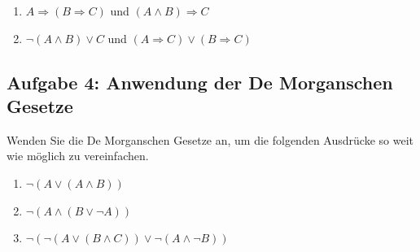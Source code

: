 \documentclass[ngerman,11pt]{article}
\begin{document}
\begin{enumerate}[label=\alph*)]
\item $A \Rightarrow (B \Rightarrow C)$ und $(A \wedge B) \Rightarrow C$
\item $\neg(A \wedge B) \vee C$ und $(A \Rightarrow C) \vee (B \Rightarrow C)$
\end{enumerate}

\subsection*{Aufgabe 4: Anwendung der De Morganschen Gesetze}
Wenden Sie die De Morganschen Gesetze an, um die folgenden Ausdrücke so weit wie möglich zu vereinfachen.

\begin{enumerate}[label=\alph*)]
\item $ \neg (A \lor (A \land B))$
\item $\neg (A \land (B \lor \neg A))$
\item $\neg (\neg(A \lor (B \land C)) \lor \neg (A \land \neg B))$
\end{enumerate}
\end{document}
